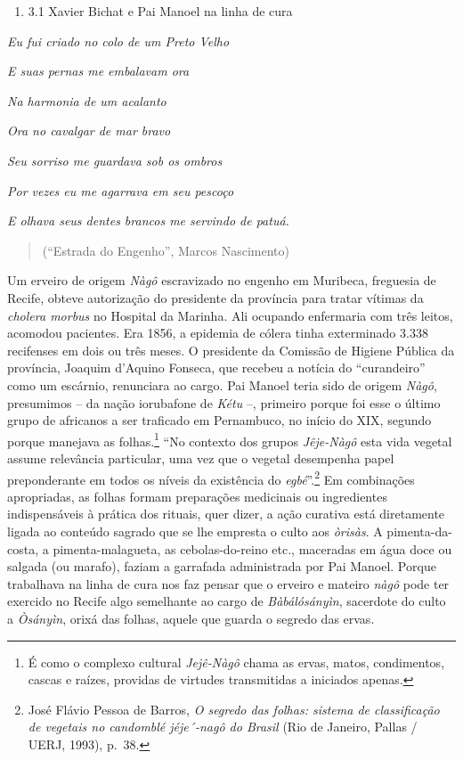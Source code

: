 \begin{enumerate}
\def\labelenumi{\arabic{enumi}.}
\setcounter{enumi}{4}
\tightlist
\item
  3.1 Xavier Bichat e Pai Manoel na linha de cura
\end{enumerate}

\emph{Eu fui criado no colo de um Preto Velho}

\emph{E suas pernas me embalavam ora}

\emph{Na harmonia de um acalanto}

\emph{Ora no cavalgar de mar bravo}

\emph{Seu sorriso me guardava sob os ombros}

\emph{Por vezes eu me agarrava em seu pescoço}

\emph{E olhava seus dentes brancos me servindo de patuá.}

\begin{quote}
(``Estrada do Engenho'', Marcos Nascimento)
\end{quote}

Um erveiro de origem \emph{Nàgô} escravizado no engenho em Muribeca,
freguesia de Recife, obteve autorização do presidente da província para
tratar vítimas da \emph{cholera morbus} no Hospital da Marinha. Ali
ocupando enfermaria com três leitos, acomodou pacientes. Era 1856, a
epidemia de cólera tinha exterminado 3.338 recifenses em dois ou três
meses. O presidente da Comissão de Higiene Pública da província, Joaquim
d'Aquino Fonseca, que recebeu a notícia do ``curandeiro'' como um
escárnio, renunciara ao cargo. Pai Manoel teria sido de origem
\emph{Nàgô}, presumimos -- da nação iorubafone de \emph{Kétu­} --,
primeiro porque foi esse o último grupo de africanos a ser traficado em
Pernambuco, no início do XIX, segundo porque manejava as
folhas.\footnote{É como o complexo cultural \emph{Jejê-Nàgô} chama as
  ervas, matos, condimentos, cascas e raízes, providas de virtudes
  transmitidas a iniciados apenas.} ``No contexto dos grupos
\emph{Jêje-Nàgô} esta vida vegetal assume relevância particular, uma vez
que o vegetal desempenha papel preponderante em todos os níveis da
existência do \emph{egbé}''.\footnote{José Flávio Pessoa de Barros,
  \emph{O segredo das folhas: sistema de classificação de vegetais no
  candomblé jéje´-nagô do Brasil} (Rio de Janeiro, Pallas / UERJ, 1993),
  p.~38.} Em combinações apropriadas, as folhas formam preparações
medicinais ou ingredientes indispensáveis à prática dos rituais, quer
dizer, a ação curativa está diretamente ligada ao conteúdo sagrado que
se lhe empresta o culto aos \emph{òrisàs}. A pimenta-da-costa, a
pimenta-malagueta, as cebolas-do-reino etc., maceradas em água doce ou
salgada (ou marafo), faziam a garrafada administrada por Pai Manoel.
Porque trabalhava na linha de cura nos faz pensar que o erveiro e
mateiro \emph{nàgô} pode ter exercido no Recife algo semelhante ao cargo
de \emph{Bàbálósányìn}, sacerdote do culto a \emph{Òsányìn}, orixá das
folhas, aquele que guarda o segredo das ervas.

